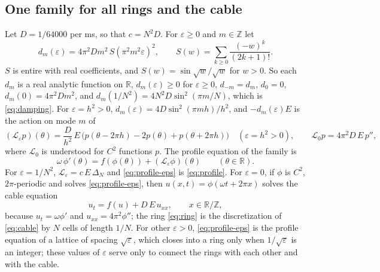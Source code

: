 \documentclass[11pt]{article}
\theoremstyle{definition}
\newcommand{\R}{\mathbb{R}}
\newcommand{\Z}{\mathbb{Z}}
\begin{document}
\subsection{One family for all rings and the cable}\label{sec:family}

Let $D = 1/64000$ per ms, so that $c = N^2D$. For $\varepsilon \ge 0$ and $m \in \Z$ let
\begin{equation}\label{eq:deps}
  d_m(\varepsilon) = 4\pi^2Dm^2\,S(\pi^2m^2\varepsilon)^2, \qquad S(w) = \sum_{k\ge0}\frac{(-w)^k}{(2k+1)!}.
\end{equation}
$S$ is entire with real coefficients, and $S(w) = \sin\sqrt w/\sqrt w$ for $w > 0$. So each $d_m$ is a real analytic function on $\R$, $d_m(\varepsilon) \ge 0$ for $\varepsilon \ge 0$, $d_{-m} = d_m$, $d_0 = 0$, $d_m(0) = 4\pi^2Dm^2$, and $d_m(1/N^2) = 4N^2D\sin^2(\pi m/N)$, which is \eqref{eq:damping}. For $\varepsilon = h^2 > 0$, $d_m(\varepsilon) = 4D\sin^2(\pi mh)/h^2$, and $-d_m(\varepsilon)E$ is the action on mode $m$ of
\begin{equation}\label{eq:Leps}
  (\mathcal L_\varepsilon p)(\theta) = \frac{D}{h^2}\,E\,\big(p(\theta - 2\pi h) - 2p(\theta) + p(\theta + 2\pi h)\big) \quad (\varepsilon = h^2 > 0), \qquad \mathcal L_0p = 4\pi^2D\,E\,p'',
\end{equation}
where $\mathcal L_0$ is understood for $C^2$ functions $p$. The profile equation of the family is
\begin{equation}\label{eq:profile-eps}
  \omega\,\phi'(\theta) = f(\phi(\theta)) + (\mathcal L_\varepsilon\phi)(\theta) \qquad (\theta \in \R).
\end{equation}
For $\varepsilon = 1/N^2$, $\mathcal L_\varepsilon = c\,E\,\Delta_N$ and \eqref{eq:profile-eps} is \eqref{eq:profile}. For $\varepsilon = 0$, if $\phi$ is $C^2$, $2\pi$-periodic and solves \eqref{eq:profile-eps}, then $u(x, t) = \phi(\omega t + 2\pi x)$ solves the cable equation
\begin{equation}\label{eq:cable}
  u_t = f(u) + D\,E\,u_{xx}, \qquad x \in \R/\Z,
\end{equation}
because $u_t = \omega\phi'$ and $u_{xx} = 4\pi^2\phi''$; the ring \eqref{eq:ring} is the discretization of \eqref{eq:cable} by $N$ cells of length $1/N$. For other $\varepsilon > 0$, \eqref{eq:profile-eps} is the profile equation of a lattice of spacing $\sqrt\varepsilon$, which closes into a ring only when $1/\sqrt\varepsilon$ is an integer; these values of $\varepsilon$ serve only to connect the rings with each other and with the cable.
\end{document}
